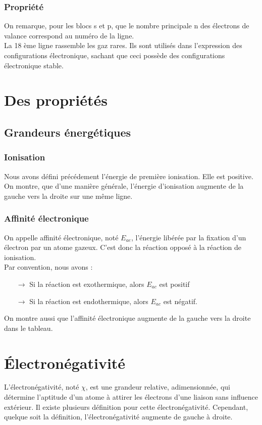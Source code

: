\subsubsection{Propriété}
On remarque, pour les blocs s et p, que le nombre principale n des électrons de valance correspond au numéro de la ligne.\\
La 18 ème ligne rassemble les gaz rares. Ils sont utilisés dans l'expression des configurations électronique, sachant que ceci possède des configurations électronique stable.
\section{Des propriétés}
\subsection{Grandeurs énergétiques}
\subsubsection{Ionisation}
Nous avons défini précédement l'énergie de première ionisation. Elle est positive. On montre, que d'une manière générale, l'énergie d'ionisation augmente de la gauche vers la droite sur une même ligne.
\subsubsection{Affinité électronique}
\begin{de}
On appelle affinité électronique, noté $E_{ae}$, l'énergie libérée par la fixation d'un électron par un atome gazeux. C'est donc la réaction opposé à la réaction de ionisation.\\
Par convention, nous avons : 
\begin{itemize}
 \item[$\rightarrow$] Si la réaction est exothermique, alors $E_{ac}$ est positif
 \item[$\rightarrow$] Si la réaction est endothermique, alors $E_{ac}$ est négatif.
\end{itemize}
On montre aussi que l'affinité électronique augmente de la gauche vers la droite dans le tableau.
\end{de}
\section{Électronégativité}
L'électronégativité, noté $\chi$, est une grandeur relative, adimensionnée, qui détermine l'aptitude d'un atome à attirer les électrons d'une liaison sans influence extérieur. Il existe plusieurs définition pour cette électronégativité. Cependant, quelque soit la définition, l'électronégativité augmente de gauche à droite. 
